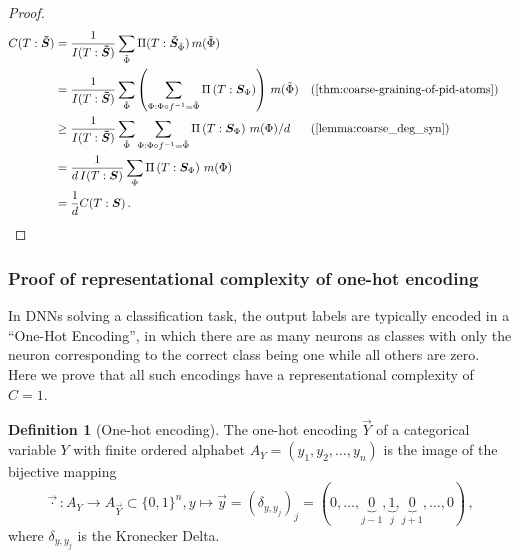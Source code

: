 \documentclass[10pt]{article}
\renewcommand\autoref[1]{\cref{#1}}
\theoremstyle{definition}
\newtheorem{definition}{Definition}[section]
\theoremstyle{plain}
\begin{document}
\begin{proof}

\begin{align*}
    C(T:\bm{\tilde{S}}) &= \frac{1}{I(T:\bm{\tilde{S}})}\sum_{\tilde{\Phi}} \Pi(T:\bm{\tilde{S}}_{\tilde{\Phi}}) \, m(\tilde{\Phi})\\
    &=\frac{1}{I(T:\bm{\tilde{S}})} \sum_{\tilde{\Phi}} \left(\sum_{\Phi:\Phi\circ f^{-1} = \tilde{\Phi}} \Pi\left(T:\bm{S}_ {\Phi}\right) \right)\, m(\tilde{\Phi}) && \text{(\autoref{thm:coarse-graining-of-pid-atoms})}\\
    &\geq \frac{1}{I(T:\bm{\tilde{S}})} \sum_{\tilde{\Phi}} \sum_{\Phi:\Phi\circ f^{-1} = \tilde{\Phi}} \Pi\left(T:\bm{S}_ {\Phi}\right) \, m(\Phi)/d && \text{(\autoref{lemma:coarse_deg_syn})}\\
    &=\frac{1}{d\,I(T:\bm{S})} \sum_\Phi \Pi\left(T:\bm{S}_ {\Phi}\right) \, m(\Phi)\\
    &= \frac{1}{d}C(T:\bm{S})\,.
\end{align*}

\end{proof}


\subsubsection{Proof of representational complexity of one-hot encoding}
\label{apx:onehot}

In DNNs solving a classification task, the output labels are typically encoded in a ``One-Hot Encoding'', in which there are as many neurons as classes with only the neuron corresponding to the correct class being one while all others are zero. Here we prove that all such encodings have a representational complexity of $C=1$.

\begin{definition}[One-hot encoding]
The one-hot encoding $\vec{Y}$ of a categorical variable $Y$ with finite ordered alphabet $A_Y = (y_1, y_2, \dots, y_n)$ is the image of the bijective mapping $$\vec{\cdot}: A_Y \to A_{\vec{Y}} \subset \{0, 1\}^n, y \mapsto \vec{y} = (\delta_{y, y_j})_j = (0, \dots, \underbrace{0}_{j-1}, \underbrace{1}_{j}, \underbrace{0}_{j+1}, \dots, 0)\,,$$ where $\delta_{y, y_j}$ is the Kronecker Delta.
\end{definition}
 
\end{document}
